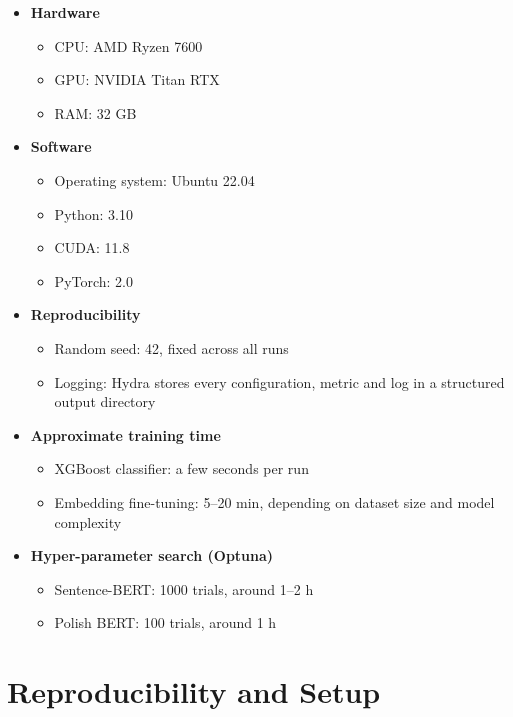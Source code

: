 \documentclass{SGGW-thesis-EN}
\begin{document}
\begin{itemize}
  \item \textbf{Hardware}
        \begin{itemize}
          \item CPU: AMD Ryzen 7600
          \item GPU: NVIDIA Titan RTX
          \item RAM: 32 GB
        \end{itemize}

  \item \textbf{Software}
        \begin{itemize}
          \item Operating system: Ubuntu 22.04
          \item Python: 3.10
          \item CUDA: 11.8
          \item PyTorch: 2.0
        \end{itemize}

  \item \textbf{Reproducibility}
        \begin{itemize}
          \item Random seed: 42, fixed across all runs
          \item Logging: Hydra stores every configuration, metric and log in a structured output directory
        \end{itemize}

  \item \textbf{Approximate training time}
        \begin{itemize}
          \item XGBoost classifier: a few seconds per run
          \item Embedding fine-tuning: 5–20 min, depending on dataset size and model complexity
        \end{itemize}

  \item \textbf{Hyper-parameter search (Optuna)}
        \begin{itemize}
          \item Sentence-BERT: 1000 trials, around 1–2 h
          \item Polish BERT: 100 trials, around 1 h
        \end{itemize}
\end{itemize}
\section{Reproducibility and Setup}
\end{document}

